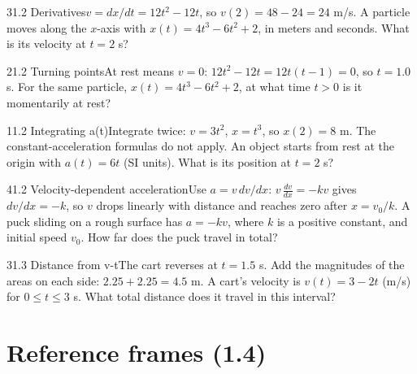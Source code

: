 \documentclass[11pt]{article}
\begin{document}
\begin{q}{3}{1.2 Derivatives}{$v = dx/dt = 12t^2 - 12t$, so $v(2) = 48 - 24 = 24$ m/s.}
A particle moves along the $x$-axis with $x(t) = 4t^3 - 6t^2 + 2$, in meters and seconds. What is its velocity at $t = 2$ s?
\end{q}
\begin{q}{2}{1.2 Turning points}{At rest means $v = 0$: $12t^2 - 12t = 12t(t - 1) = 0$, so $t = 1.0$ s.}
For the same particle, $x(t) = 4t^3 - 6t^2 + 2$, at what time $t > 0$ is it momentarily at rest?
\end{q}
\begin{q}{1}{1.2 Integrating a(t)}{Integrate twice: $v = 3t^2$, $x = t^3$, so $x(2) = 8$ m. The constant-acceleration formulas do not apply.}
An object starts from rest at the origin with $a(t) = 6t$ (SI units). What is its position at $t = 2$ s?
\end{q}
\begin{q}{4}{1.2 Velocity-dependent acceleration}{Use $a = v\,dv/dx$: $v\,\frac{dv}{dx} = -kv$ gives $dv/dx = -k$, so $v$ drops linearly with distance and reaches zero after $x = v_0/k$.}
A puck sliding on a rough surface has $a = -kv$, where $k$ is a positive constant, and initial speed $v_0$. How far does the puck travel in total?
\end{q}
\begin{q}{3}{1.3 Distance from v-t}{The cart reverses at $t = 1.5$ s. Add the magnitudes of the areas on each side: $2.25 + 2.25 = 4.5$ m.}
A cart's velocity is $v(t) = 3 - 2t$ (m/s) for $0 \le t \le 3$ s. What total distance does it travel in this interval?
\end{q}

\section{Reference frames (1.4)}
\end{document}
